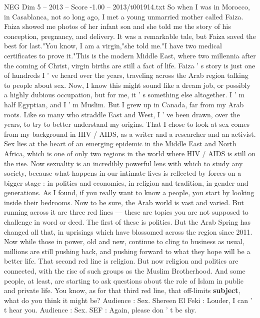 \begin{textsample}{NEG Dim 5 – 2013 – Score -1.00 – 2013/t001914.txt}  \label{ex:f5_neg_041}
So when I was in Morocco, in Casablanca, not so long ago, I met a young unmarried mother called Faiza.
Faiza showed me photos of her infant son and she told me the story of his conception, pregnancy, and delivery.
It was a remarkable tale, but Faiza saved the best for last."You know, I am a virgin,"she told me."I have two medical certificates to prove it."This is the modern Middle East, where two millennia after the coming of Christ, virgin births are still a fact of life.
Faiza ' s story is just one of hundreds I ' ve heard over the years, traveling across the Arab region talking to people about sex.
Now, I know this might sound like a dream job, or possibly a highly dubious occupation, but for me, it ' s something else altogether.
I ' m half Egyptian, and I ' m Muslim.
But I grew up in Canada, far from my Arab roots.
Like so many who straddle East and West, I ' ve been drawn, over the years, to try to better understand my origins.
That I chose to look at sex comes from my background in HIV / AIDS, as a writer and a researcher and an activist.
Sex lies at the heart of an emerging epidemic in the Middle East and North Africa, which is one of only two regions in the world where HIV / AIDS is still on the rise.
Now sexuality is an incredibly powerful lens with which to study any society, because what happens in our intimate lives is reflected by forces on a bigger stage : in politics and economics, in religion and tradition, in gender and generations.
As I found, if you really want to know a people, you start by looking inside their bedrooms.
Now to be sure, the Arab world is vast and varied.
But running across it are three red lines — these are topics you are not supposed to challenge in word or deed.
The first of these is politics.
But the Arab Spring has changed all that, in uprisings which have blossomed across the region since 2011.
Now while those in power, old and new, continue to cling to business as usual, millions are still pushing back, and pushing forward to what they hope will be a better life.
That second red line is religion.
But now religion and politics are connected, with the rise of such groups as the Muslim Brotherhood.
And some people, at least, are starting to ask questions about the role of Islam in public and private life.
You know, as for that third red line, that off-limits \textbf{subject}, what do you think it might be?
Audience : Sex.
Shereen El Feki : Louder, I can ' t hear you.
Audience : Sex.
SEF : Again, please don ' t be shy.

\end{textsample}
